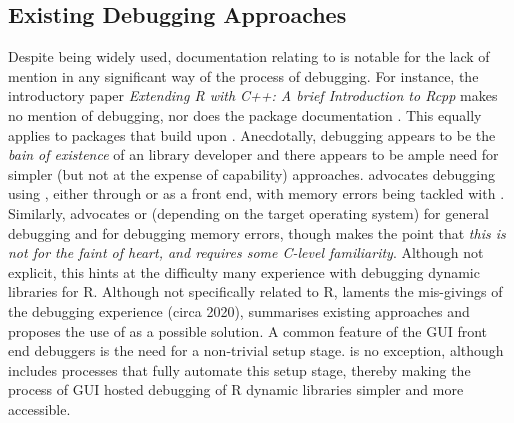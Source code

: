 \hypertarget{exitising-debugging-approaches}{%
\subsection{Existing Debugging Approaches}
\label{exitising-debugging-approaches}}
Despite being widely used, documentation relating to  is notable for the lack of mention in any significant way of the process of debugging. For instance, the 
introductory paper \emph{Extending R with C++: A brief Introduction to Rcpp} \citep{RcppIntro} makes no mention of debugging, nor does the package documentation \citep{Rcpp}. 
This equally applies to packages that build upon . Anecdotally, debugging appears to be the \emph{bain of existence} of an  library developer and 
there appears to be ample need for simpler (but not at the expense of capability) approaches. \citep{DebuggingRandCcodeinR} advocates debugging using 
\citep{GDB}, either through  or \citep{DDD} as a  front end, with memory errors being tackled with \citep{valgrind}. Similarly, 
\citep{DebuggingC_Cpp} advocates  or  \citep{LLDB} (depending on the target operating system) for general debugging and  for debugging memory 
errors, though makes the point that \emph{this is not for the faint of heart, and requires some C-level familiarity}. Although not explicit, this hints at the difficulty
many experience with debugging dynamic libraries for R. Although not specifically related to R, \citep{ImprovingCppDebug} laments the mis-givings of the debugging experience 
(circa 2020), summarises existing approaches and proposes the use of \citep{VSCodeDownload} as a possible solution. A common feature of the 
GUI front end debuggers is the need for a non-trivial setup stage.  is no exception, although  includes processes that fully automate
this setup stage, thereby making the process of GUI hosted debugging of R dynamic libraries simpler and more accessible.

